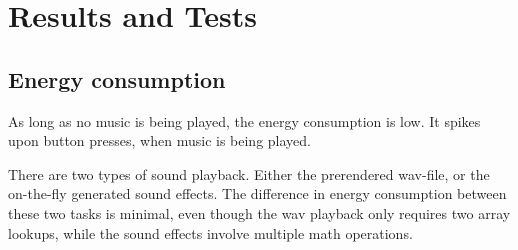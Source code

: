 \section{Results and Tests}

\subsection{Energy consumption}

As long as no music is being played, the energy consumption is low.
It spikes upon button presses, when music is being played.

There are two types of sound playback. Either the prerendered wav-file, or the on-the-fly generated sound effects. The difference in energy consumption between these two tasks is minimal, even though the wav playback only requires two array lookups, while the sound effects involve multiple math operations.
